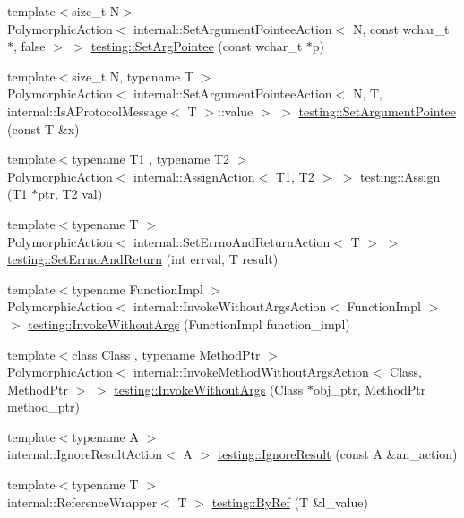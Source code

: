 \begin{DoxyCompactItemize}
\item 
{\footnotesize template$<$size\+\_\+t N$>$ }\\Polymorphic\+Action$<$ internal\+::\+Set\+Argument\+Pointee\+Action$<$ N, const wchar\+\_\+t $\ast$, false $>$ $>$ \hyperlink{namespacetesting_ac128085b4a8d64563fd5ccef324ea177}{testing\+::\+Set\+Arg\+Pointee} (const wchar\+\_\+t $\ast$p)
\item 
{\footnotesize template$<$size\+\_\+t N, typename T $>$ }\\Polymorphic\+Action$<$ internal\+::\+Set\+Argument\+Pointee\+Action$<$ N, T, internal\+::\+Is\+A\+Protocol\+Message$<$ T $>$\+::value $>$ $>$ \hyperlink{namespacetesting_a03b315d27c91a8e719f2b6c09964130b}{testing\+::\+Set\+Argument\+Pointee} (const T \&x)
\item 
{\footnotesize template$<$typename T1 , typename T2 $>$ }\\Polymorphic\+Action$<$ internal\+::\+Assign\+Action$<$ T1, T2 $>$ $>$ \hyperlink{namespacetesting_abfc4121b8708e8b22a096ff8be88a9d0}{testing\+::\+Assign} (T1 $\ast$ptr, T2 val)
\item 
{\footnotesize template$<$typename T $>$ }\\Polymorphic\+Action$<$ internal\+::\+Set\+Errno\+And\+Return\+Action$<$ T $>$ $>$ \hyperlink{namespacetesting_a31095e421f167fade2e6d4d60df1f4da}{testing\+::\+Set\+Errno\+And\+Return} (int errval, T result)
\item 
{\footnotesize template$<$typename Function\+Impl $>$ }\\Polymorphic\+Action$<$ internal\+::\+Invoke\+Without\+Args\+Action$<$ Function\+Impl $>$ $>$ \hyperlink{namespacetesting_a88cc1999296bc630f6a49cdf66bb21f9}{testing\+::\+Invoke\+Without\+Args} (Function\+Impl function\+\_\+impl)
\item 
{\footnotesize template$<$class Class , typename Method\+Ptr $>$ }\\Polymorphic\+Action$<$ internal\+::\+Invoke\+Method\+Without\+Args\+Action$<$ Class, Method\+Ptr $>$ $>$ \hyperlink{namespacetesting_ab75325d71a8c37db94f349243815c728}{testing\+::\+Invoke\+Without\+Args} (Class $\ast$obj\+\_\+ptr, Method\+Ptr method\+\_\+ptr)
\item 
{\footnotesize template$<$typename A $>$ }\\internal\+::\+Ignore\+Result\+Action$<$ A $>$ \hyperlink{namespacetesting_a50ae42540a31047c7fddd32df8d835f5}{testing\+::\+Ignore\+Result} (const A \&an\+\_\+action)
\item 
{\footnotesize template$<$typename T $>$ }\\internal\+::\+Reference\+Wrapper$<$ T $>$ \hyperlink{namespacetesting_aaee6d42dcd69de6e7a1459c5c71222c3}{testing\+::\+By\+Ref} (T \&l\+\_\+value)
\end{DoxyCompactItemize}


